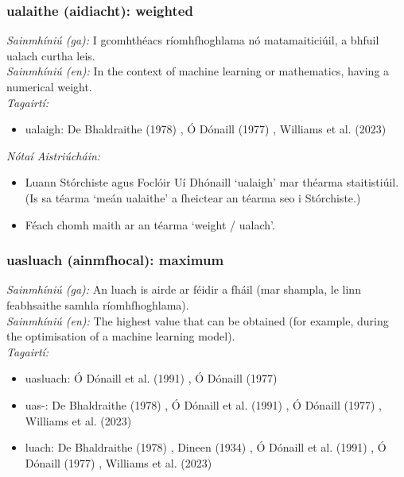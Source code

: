 \subsubsection*{ualaithe (aidiacht): weighted}
 \noindent \textit{Sainmhíniú (ga):} I gcomhthéacs ríomhfhoghlama nó matamaiticiúil, a bhfuil ualach curtha leis.
\\
 \noindent \textit{Sainmhíniú (en):} In the context of machine learning or mathematics, having a numerical weight.
\\
 \noindent \textit{Tagairtí:}
\begin{itemize}
	\item ualaigh: De Bhaldraithe (1978) \cite{de-bhaldraithe}, Ó Dónaill (1977) \cite{odonaill}, Williams et al. (2023) \cite{storchiste}
\end{itemize}

 \noindent \textit{Nótaí Aistriúcháin:}
\begin{itemize}
	\item Luann Stórchiste agus Foclóir Uí Dhónaill `ualaigh' mar théarma staitistiúil. (Is sa téarma `meán ualaithe' a fheictear an téarma seo i Stórchiste.)
	\item Féach chomh maith ar an téarma `weight / ualach'.
\end{itemize}


\subsubsection*{uasluach (ainmfhocal): maximum}
 \noindent \textit{Sainmhíniú (ga):} An luach is airde ar féidir a fháil (mar shampla, le linn feabhsaithe samhla ríomhfhoghlama).
\\
 \noindent \textit{Sainmhíniú (en):} The highest value that can be obtained (for example, during the optimisation of a machine learning model).
\\
 \noindent \textit{Tagairtí:}
\begin{itemize}
	\item uasluach: Ó Dónaill et al. (1991) \cite{focloir-beag}, Ó Dónaill (1977) \cite{odonaill}
	\item uas-: De Bhaldraithe (1978) \cite{de-bhaldraithe}, Ó Dónaill et al. (1991) \cite{focloir-beag}, Ó Dónaill (1977) \cite{odonaill}, Williams et al. (2023) \cite{storchiste}
	\item luach: De Bhaldraithe (1978) \cite{de-bhaldraithe}, Dineen (1934) \cite{dineen}, Ó Dónaill et al. (1991) \cite{focloir-beag}, Ó Dónaill (1977) \cite{odonaill}, Williams et al. (2023) \cite{storchiste}
\end{itemize}

